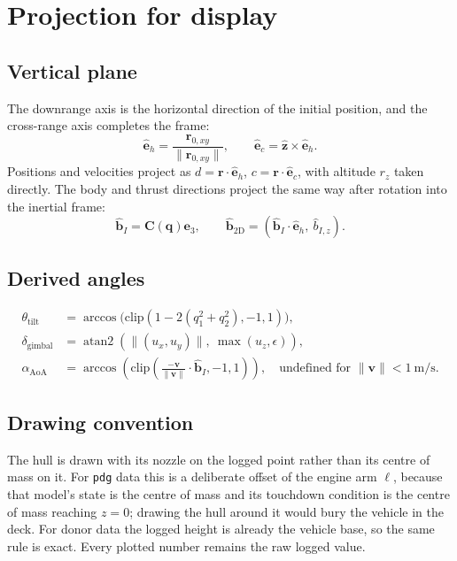 \documentclass[11pt,a4paper]{article}
\newcommand{\vect}[1]{\mathbf{#1}}
\newcommand{\quat}[1]{\mathbf{#1}}
\newcommand{\Rot}{\vect{C}}
\newcommand{\eh}{\hat{\vect{e}}_h}
\newcommand{\ec}{\hat{\vect{e}}_c}
\newcommand{\code}[1]{\texttt{#1}}
\begin{document}
\section{Projection for display}
\label{sec:projection}

\subsection{Vertical plane}

The downrange axis is the horizontal direction of the initial position, and the
cross-range axis completes the frame:
\begin{equation}
\eh = \frac{\vect{r}_{0,xy}}{\lVert\vect{r}_{0,xy}\rVert},
\qquad
\ec = \hat{\vect{z}}\times\eh .
\end{equation}
Positions and velocities project as $d=\vect{r}\cdot\eh$,
$c=\vect{r}\cdot\ec$, with altitude $r_z$ taken directly. The body and thrust
directions project the same way after rotation into the inertial frame:
\begin{equation}
\hat{\vect{b}}_I = \Rot(\quat{q})\vect{e}_3,
\qquad
\hat{\vect{b}}_{\text{2D}} = \left(\hat{\vect{b}}_I\cdot\eh,\ \hat b_{I,z}\right).
\end{equation}

\subsection{Derived angles}

\begin{align}
\theta_{\mathrm{tilt}} &= \arccos\bigl(\mathrm{clip}(1-2(q_1^2+q_2^2),-1,1)\bigr), \\
\delta_{\mathrm{gimbal}} &= \operatorname{atan2}\!\left(\lVert(u_x,u_y)\rVert,\ \max(u_z,\epsilon)\right), \\
\alpha_{\mathrm{AoA}} &= \arccos\!\left(\mathrm{clip}\!\left(
  \frac{-\vect{v}}{\lVert\vect{v}\rVert}\cdot\hat{\vect{b}}_I,-1,1\right)\right),
  \quad \text{undefined for } \lVert\vect{v}\rVert<1\ \mathrm{m/s}.
\end{align}

\subsection{Drawing convention}

The hull is drawn with its nozzle on the logged point rather than its centre of
mass on it. For \code{pdg} data this is a deliberate offset of the engine arm
$\ell$, because that model's state is the centre of mass and its touchdown
condition is the centre of mass reaching $z=0$; drawing the hull around it would
bury the vehicle in the deck. For donor data the logged height is already the
vehicle base, so the same rule is exact. Every plotted number remains the raw
logged value.
\end{document}
